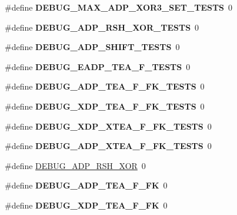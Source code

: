 \begin{DoxyCompactItemize}
\item 
\hypertarget{common_8hh_a564e1cfe8dfed8c0036a8906a5c9e3c1}{\#define {\bfseries \-D\-E\-B\-U\-G\-\_\-\-M\-A\-X\-\_\-\-A\-D\-P\-\_\-\-X\-O\-R3\-\_\-\-S\-E\-T\-\_\-\-T\-E\-S\-T\-S}~0}\label{common_8hh_a564e1cfe8dfed8c0036a8906a5c9e3c1}

\item 
\hypertarget{common_8hh_ab0ac9bb376657862055b616a996fb209}{\#define {\bfseries \-D\-E\-B\-U\-G\-\_\-\-A\-D\-P\-\_\-\-R\-S\-H\-\_\-\-X\-O\-R\-\_\-\-T\-E\-S\-T\-S}~0}\label{common_8hh_ab0ac9bb376657862055b616a996fb209}

\item 
\hypertarget{common_8hh_abd12dc589dc2bca6d5215ba9c2b4aa90}{\#define {\bfseries \-D\-E\-B\-U\-G\-\_\-\-A\-D\-P\-\_\-\-S\-H\-I\-F\-T\-\_\-\-T\-E\-S\-T\-S}~0}\label{common_8hh_abd12dc589dc2bca6d5215ba9c2b4aa90}

\item 
\hypertarget{common_8hh_af4863f0a07354057f26c1a6d8e77aebf}{\#define {\bfseries \-D\-E\-B\-U\-G\-\_\-\-E\-A\-D\-P\-\_\-\-T\-E\-A\-\_\-\-F\-\_\-\-T\-E\-S\-T\-S}~0}\label{common_8hh_af4863f0a07354057f26c1a6d8e77aebf}

\item 
\hypertarget{common_8hh_ae4774f104df4683529d9a6d304d5f103}{\#define {\bfseries \-D\-E\-B\-U\-G\-\_\-\-A\-D\-P\-\_\-\-T\-E\-A\-\_\-\-F\-\_\-\-F\-K\-\_\-\-T\-E\-S\-T\-S}~0}\label{common_8hh_ae4774f104df4683529d9a6d304d5f103}

\item 
\hypertarget{common_8hh_a7ec5735adf91d7ff32d858d55d302668}{\#define {\bfseries \-D\-E\-B\-U\-G\-\_\-\-X\-D\-P\-\_\-\-T\-E\-A\-\_\-\-F\-\_\-\-F\-K\-\_\-\-T\-E\-S\-T\-S}~0}\label{common_8hh_a7ec5735adf91d7ff32d858d55d302668}

\item 
\hypertarget{common_8hh_a6e11aa5e139272af12546be1094a8c8f}{\#define {\bfseries \-D\-E\-B\-U\-G\-\_\-\-X\-D\-P\-\_\-\-X\-T\-E\-A\-\_\-\-F\-\_\-\-F\-K\-\_\-\-T\-E\-S\-T\-S}~0}\label{common_8hh_a6e11aa5e139272af12546be1094a8c8f}

\item 
\hypertarget{common_8hh_a3a644f4dad6c8eee313edb9943016c14}{\#define {\bfseries \-D\-E\-B\-U\-G\-\_\-\-A\-D\-P\-\_\-\-X\-T\-E\-A\-\_\-\-F\-\_\-\-F\-K\-\_\-\-T\-E\-S\-T\-S}~0}\label{common_8hh_a3a644f4dad6c8eee313edb9943016c14}

\item 
\#define \hyperlink{common_8hh_abaca5e518fa8172d63d54fc0ba01b0e3}{\-D\-E\-B\-U\-G\-\_\-\-A\-D\-P\-\_\-\-R\-S\-H\-\_\-\-X\-O\-R}~0
\item 
\hypertarget{common_8hh_a1b6aa671896c66476c9a5a021c529c01}{\#define {\bfseries \-D\-E\-B\-U\-G\-\_\-\-A\-D\-P\-\_\-\-T\-E\-A\-\_\-\-F\-\_\-\-F\-K}~0}\label{common_8hh_a1b6aa671896c66476c9a5a021c529c01}

\item 
\hypertarget{common_8hh_ae0877d7d255a8b49f54ec02ce90ef68d}{\#define {\bfseries \-D\-E\-B\-U\-G\-\_\-\-X\-D\-P\-\_\-\-T\-E\-A\-\_\-\-F\-\_\-\-F\-K}~0}\label{common_8hh_ae0877d7d255a8b49f54ec02ce90ef68d}

\end{DoxyCompactItemize}
